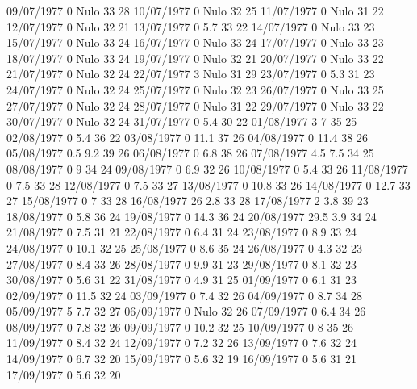 09/07/1977  0     Nulo    33     28 
10/07/1977  0     Nulo    32     25 
11/07/1977  0     Nulo    31     22 
12/07/1977  0     Nulo    32     21 
13/07/1977  0      5.7    33     22 
14/07/1977  0     Nulo    33     23 
15/07/1977  0     Nulo    33     24 
16/07/1977  0     Nulo    33     24 
17/07/1977  0     Nulo    33     23 
18/07/1977  0     Nulo    33     24 
19/07/1977  0     Nulo    32     21 
20/07/1977  0     Nulo    33     22 
21/07/1977  0     Nulo    32     24 
22/07/1977  3     Nulo    31     29 
23/07/1977  0      5.3    31     23 
24/07/1977  0     Nulo    32     24 
25/07/1977  0     Nulo    32     23 
26/07/1977  0     Nulo    33     25 
27/07/1977  0     Nulo    32     24 
28/07/1977  0     Nulo    31     22 
29/07/1977  0     Nulo    33     22 
30/07/1977  0     Nulo    32     24 
31/07/1977  0      5.4    30     22 
01/08/1977  3      7      35     25 
02/08/1977  0      5.4    36     22 
03/08/1977  0      11.1   37     26 
04/08/1977  0      11.4   38     26 
05/08/1977  0.5    9.2    39     26 
06/08/1977  0      6.8    38     26 
07/08/1977  4.5    7.5    34     25 
08/08/1977  0      9      34     24 
09/08/1977  0      6.9    32     26 
10/08/1977  0      5.4    33     26 
11/08/1977  0      7.5    33     28 
12/08/1977  0      7.5    33     27 
13/08/1977  0      10.8   33     26 
14/08/1977  0      12.7   33     27 
15/08/1977  0      7      33     28 
16/08/1977  26     2.8    33     28 
17/08/1977  2      3.8    39     23 
18/08/1977  0      5.8    36     24 
19/08/1977  0      14.3   36     24 
20/08/1977  29.5   3.9    34     24 
21/08/1977  0      7.5    31     21 
22/08/1977  0      6.4    31     24 
23/08/1977  0      8.9    33     24 
24/08/1977  0      10.1   32     25 
25/08/1977  0      8.6    35     24 
26/08/1977  0      4.3    32     23 
27/08/1977  0      8.4    33     26 
28/08/1977  0      9.9    31     23 
29/08/1977  0      8.1    32     23 
30/08/1977  0      5.6    31     22 
31/08/1977  0      4.9    31     25 
01/09/1977  0      6.1    31     23 
02/09/1977  0      11.5   32     24 
03/09/1977  0      7.4    32     26 
04/09/1977  0      8.7    34     28 
05/09/1977  5      7.7    32     27 
06/09/1977  0     Nulo    32     26 
07/09/1977  0      6.4    34     26 
08/09/1977  0      7.8    32     26 
09/09/1977  0      10.2   32     25 
10/09/1977  0      8      35     26 
11/09/1977  0      8.4    32     24 
12/09/1977  0      7.2    32     26 
13/09/1977  0      7.6    32     24 
14/09/1977  0      6.7    32     20 
15/09/1977  0      5.6    32     19 
16/09/1977  0      5.6    31     21 
17/09/1977  0      5.6    32     20 
